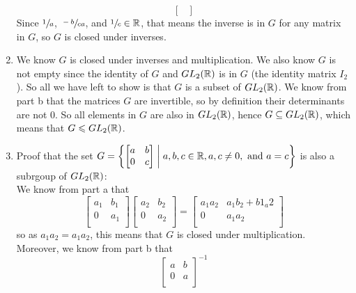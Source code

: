 \documentclass[12pt]{article}
\begin{document}
\begin{enumerate}[label=\textbf{\alph*.}]
\[\begin{bmatrix}
            \end{bmatrix} \]
            Since $\sfrac{1}{a}$, $\sfrac{-b}{ca}$,
            and $\sfrac{1}{c} \in \mathbb{R}$,
            that means the inverse is in $G$ for any matrix in $G$,
            so $G$ is closed under inverses.
        \item
            We know $G$ is closed under inverses and multiplication.
            We also know $G$ is not empty since the identity of $G$
            and $GL_2(\mathbb{R})$ is in $G$ (the identity matrix $I_2$).
            So all we have left to show is that $G$ is a subset of $GL_2(\mathbb{R})$.
            We know from part b that the matrices $G$ are invertible,
            so by definition their determinants are not 0.
            So all elements in $G$ are also in $GL_2(\mathbb{R})$,
            hence $G \subseteq GL_2(\mathbb{R})$,
            which means that $G \leqslant GL_2(\mathbb{R})$.
        \item
            Proof that the set
            $G = \left\{ \begin{bmatrix} a & b \\ 0 & c \end{bmatrix} \;
            \middle\vert \; a, b, c \in \mathbb{R}, a, c \neq 0,
            \text{ and } a = c \right\}$
            is also a subrgoup of $GL_2(\mathbb{R})$: \\
            We know from part a that
            \[ \begin{bmatrix}
            a_1 & b_1 \\
            0 & a_1 \\
            \end{bmatrix}
            \begin{bmatrix}
            a_2 & b_2 \\
            0 & a_2 \\
            \end{bmatrix}
            = \begin{bmatrix}
            a_1a_2 & a_1b_2 + b1_a2 \\
            0 & a_1a_2 \\
            \end{bmatrix} \]
            so as $a_1a_2 = a_1a_2$,
            this means that $G$ is closed under multiplication. \\
            Moreover, we know from part b that
            \[ \begin{bmatrix}
            a & b \\
            0 & a \\
            \end{bmatrix}^{-1}
\]
\end{enumerate}
\end{document}
